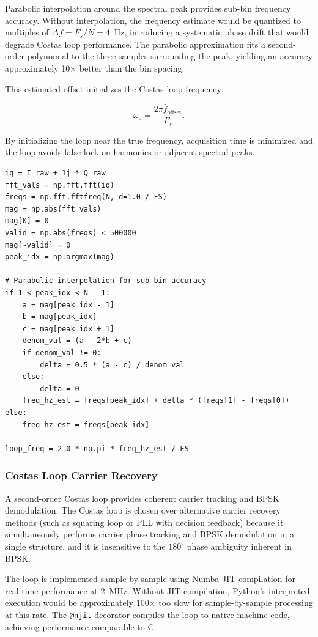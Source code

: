 \documentclass{article}
\begin{document}
Parabolic interpolation around the spectral peak provides sub-bin frequency accuracy. Without interpolation, the frequency estimate would be quantized to multiples of $\Delta f = F_s/N = 4$~Hz, introducing a systematic phase drift that would degrade Costas loop performance. The parabolic approximation fits a second-order polynomial to the three samples surrounding the peak, yielding an accuracy approximately 10$\times$ better than the bin spacing.

This estimated offset initializes the Costas loop frequency:

\begin{equation}
\omega_0 = \frac{2\pi \hat{f}_{\text{offset}}}{F_s}.
\end{equation}

By initializing the loop near the true frequency, acquisition time is minimized and the loop avoids false lock on harmonics or adjacent spectral peaks.

\begin{verbatim}
iq = I_raw + 1j * Q_raw
fft_vals = np.fft.fft(iq)
freqs = np.fft.fftfreq(N, d=1.0 / FS)
mag = np.abs(fft_vals)
mag[0] = 0
valid = np.abs(freqs) < 500000
mag[~valid] = 0
peak_idx = np.argmax(mag)

# Parabolic interpolation for sub-bin accuracy
if 1 < peak_idx < N - 1:
    a = mag[peak_idx - 1]
    b = mag[peak_idx]
    c = mag[peak_idx + 1]
    denom_val = (a - 2*b + c)
    if denom_val != 0:
        delta = 0.5 * (a - c) / denom_val
    else:
        delta = 0
    freq_hz_est = freqs[peak_idx] + delta * (freqs[1] - freqs[0])
else:
    freq_hz_est = freqs[peak_idx]

loop_freq = 2.0 * np.pi * freq_hz_est / FS
\end{verbatim}

\subsubsection{Costas Loop Carrier Recovery}

A second-order Costas loop provides coherent carrier tracking and BPSK demodulation. The Costas loop is chosen over alternative carrier recovery methods (such as squaring loop or PLL with decision feedback) because it simultaneously performs carrier phase tracking and BPSK demodulation in a single structure, and it is insensitive to the $180^\circ$ phase ambiguity inherent in BPSK.

The loop is implemented sample-by-sample using Numba JIT compilation for real-time performance at 2~MHz. Without JIT compilation, Python's interpreted execution would be approximately 100$\times$ too slow for sample-by-sample processing at this rate. The \texttt{@njit} decorator compiles the loop to native machine code, achieving performance comparable to C.
\end{document}
